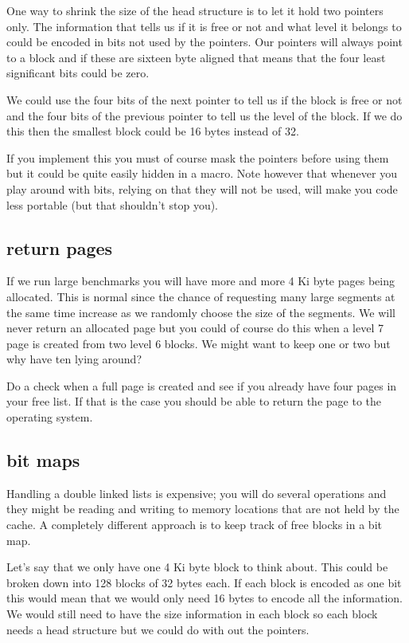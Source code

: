 \documentclass[a4paper,11pt]{article}
\begin{document}
One way to shrink the size of the head structure is to let it hold two
pointers only. The information that tells us if it is free or not and
what level it belongs to could be encoded in bits not used by the
pointers. Our pointers will always point to a block and if these are
sixteen byte aligned that means that the four least significant bits
could be zero.

We could use the four bits of the next pointer to tell us if the
block is free or not and the four bits of the previous pointer to tell
us the level of the block. If we do this then the smallest block could
be 16 bytes instead of 32.

If you implement this you must of course mask the pointers before using
them but it could be quite easily hidden in a macro. Note however that
whenever you play around with bits, relying on that they will not be
used, will make you code less portable (but that shouldn't stop you). 

  
\subsection{return pages}

If we run large benchmarks you will have more and more 4 Ki byte pages
being allocated. This is normal since the chance of requesting many
large segments at the same time increase as we randomly choose the
size of the segments. We will never return an allocated page but you
could of course do this when a level 7 page is created from two level
6 blocks. We might want to keep one or two but why have ten lying
around?

Do a check when a full page is created and see if you already have
four pages in your free list. If that is the case you should be able
to return the page to the operating system.

\subsection{bit maps}

Handling a double linked lists is expensive; you will do several
operations and they might be reading and writing to memory locations
that are not held by the cache. A completely different approach is to
keep track of free blocks in a bit map.

Let's say that we only have one 4 Ki byte block to think about. This
could be broken down into 128 blocks of 32 bytes each. If each block
is encoded as one bit this would mean that we would only need 16 bytes
to encode all the information. We would still need to have the size
information in each block so each block needs a head structure but we
could do with out the pointers.
\end{document}
